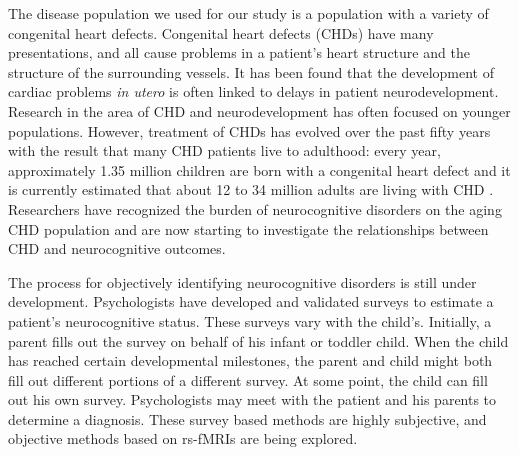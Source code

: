 




The disease population we used for our study is a population with a variety of congenital heart defects. Congenital heart defects (CHDs) have many presentations, and all cause problems in a patient's heart structure and the structure of the surrounding vessels. It has been found that the development of cardiac problems \textit{in utero} is often linked to delays in patient neurodevelopment. Research in the area of CHD and neurodevelopment has often focused on younger populations. However, treatment of CHDs has evolved over the past fifty years with the result that many CHD patients live to adulthood: every year, approximately 1.35 million children are born with a congenital heart defect and it is currently estimated that about 12 to 34 million adults are living with CHD \cite{VanderLinde2011}. Researchers have recognized the burden of neurocognitive disorders on the aging CHD population and are now starting to investigate the relationships between CHD and neurocognitive outcomes.

The process for objectively identifying neurocognitive disorders is still under development. Psychologists have developed and validated surveys to estimate a patient's neurocognitive status. These surveys vary with the child's. Initially, a parent fills out the survey on behalf of his infant or toddler child. When the child has reached certain developmental milestones, the parent and child might both fill out different portions of a different survey. At some point, the child can fill out his own survey. Psychologists may meet with the patient and his parents to determine a diagnosis. These survey based methods are highly subjective, and objective methods based on rs-fMRIs are being explored. 

